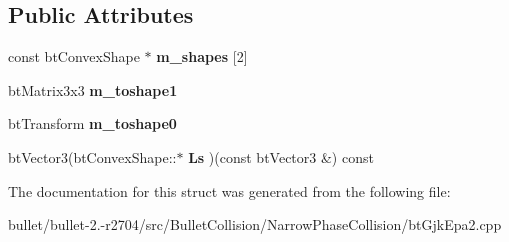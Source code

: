 \subsection*{Public Attributes}
\begin{DoxyCompactItemize}
\item 
\hypertarget{structgjkepa2__impl_1_1_minkowski_diff_a3d3f5a9789c7184e5adc6f81761bd2c8}{const bt\+Convex\+Shape $\ast$ {\bfseries m\+\_\+shapes} \mbox{[}2\mbox{]}}\label{structgjkepa2__impl_1_1_minkowski_diff_a3d3f5a9789c7184e5adc6f81761bd2c8}

\item 
\hypertarget{structgjkepa2__impl_1_1_minkowski_diff_a6a0374ad6fc23d5fdcb4f50b7fbf457f}{bt\+Matrix3x3 {\bfseries m\+\_\+toshape1}}\label{structgjkepa2__impl_1_1_minkowski_diff_a6a0374ad6fc23d5fdcb4f50b7fbf457f}

\item 
\hypertarget{structgjkepa2__impl_1_1_minkowski_diff_ad3b88e820bf02ad378bcf7219b6d706e}{bt\+Transform {\bfseries m\+\_\+toshape0}}\label{structgjkepa2__impl_1_1_minkowski_diff_ad3b88e820bf02ad378bcf7219b6d706e}

\item 
\hypertarget{structgjkepa2__impl_1_1_minkowski_diff_a5d5357013a6114698057cc0b949fea0a}{bt\+Vector3(bt\+Convex\+Shape\+::$\ast$ {\bfseries Ls} )(const bt\+Vector3 \&) const }\label{structgjkepa2__impl_1_1_minkowski_diff_a5d5357013a6114698057cc0b949fea0a}

\end{DoxyCompactItemize}


The documentation for this struct was generated from the following file\+:\begin{DoxyCompactItemize}
\item 
bullet/bullet-\/2.-\/r2704/src/\+Bullet\+Collision/\+Narrow\+Phase\+Collision/bt\+Gjk\+Epa2.\+cpp\end{DoxyCompactItemize}
